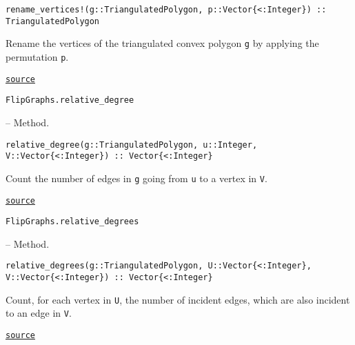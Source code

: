 \begin{adjustwidth}{2em}{0pt}


\begin{verbatim}
rename_vertices!(g::TriangulatedPolygon, p::Vector{<:Integer}) :: TriangulatedPolygon
\end{verbatim}

Rename the vertices of the triangulated convex polygon \texttt{g} by applying the permutation \texttt{p}.



\href{https://github.com/schto223/FlipGraphs.jl/blob/490c01a7adf74b42f27dda05099165c47ae8133e/src/flipGraphPlanar.jl#L330-L334}{\texttt{source}}


\end{adjustwidth}
\hypertarget{2627864872710428840}{\texttt{FlipGraphs.relative\_degree}}  -- {Method.}

\begin{adjustwidth}{2em}{0pt}


\begin{verbatim}
relative_degree(g::TriangulatedPolygon, u::Integer, V::Vector{<:Integer}) :: Vector{<:Integer}
\end{verbatim}

Count the number of edges in \texttt{g} going from \texttt{u} to a vertex in \texttt{V}.



\href{https://github.com/schto223/FlipGraphs.jl/blob/490c01a7adf74b42f27dda05099165c47ae8133e/src/flipGraphPlanar.jl#L395-L399}{\texttt{source}}


\end{adjustwidth}
\hypertarget{11363186084085056127}{\texttt{FlipGraphs.relative\_degrees}}  -- {Method.}

\begin{adjustwidth}{2em}{0pt}


\begin{verbatim}
relative_degrees(g::TriangulatedPolygon, U::Vector{<:Integer}, V::Vector{<:Integer}) :: Vector{<:Integer}
\end{verbatim}

Count, for each vertex in \texttt{U}, the number of incident edges, which are also incident to an edge in \texttt{V}.



\href{https://github.com/schto223/FlipGraphs.jl/blob/490c01a7adf74b42f27dda05099165c47ae8133e/src/flipGraphPlanar.jl#L380-L384}{\texttt{source}}


\end{adjustwidth}

